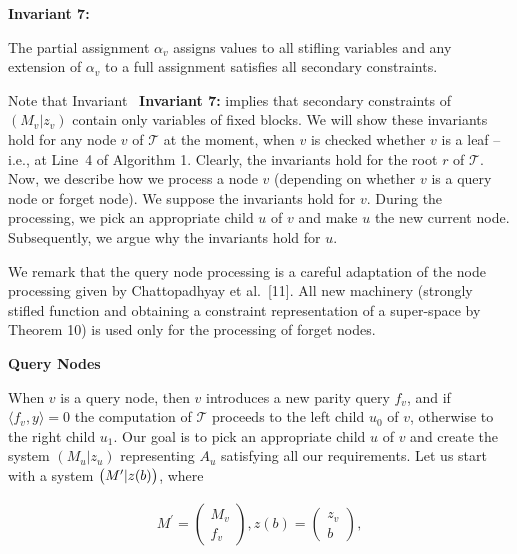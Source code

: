\documentclass[10pt,a4paper]{article}
\begin{document}
\textbf{ Invariant 7:}



The partial assignment $\alpha_{v}$ assigns values to all stifling variables and any extension of $\alpha_{v}$ to a full assignment satisfies all secondary constraints.\par







Note that Invariant \textbf{ Invariant 7:} implies that secondary constraints of $(M_{v}|z_{v})$ contain only variables of fixed blocks.
We will show these invariants hold for any node $v$ of $\mathcal{T}$ at the moment, when $v$ is checked whether $v$ is a leaf – i.e., at Line 4 of Algorithm 1.
Clearly, the invariants hold for the root $r$ of $\mathcal{T}$.
Now, we describe how we process a node $v$ (depending on whether $v$ is a query node or forget node).
We suppose the invariants hold for $v$.
During the processing, we pick an appropriate child $u$ of $v$ and make $u$ the new current node.
Subsequently, we argue why the invariants hold for $u$.\par




We remark that the query node processing is a careful adaptation of the node processing given by Chattopadhyay et al. [11].
All new machinery (strongly stifled function and obtaining a constraint representation of a super-space by Theorem 10) is used only for the processing of forget nodes.\par





\par\medskip\noindent\textbf{Query Nodes}\par




When $v$ is a query node, then $v$ introduces a new parity query $f_{v}$, and if $\langle f_{v},y\rangle=0$ the computation of $\mathcal{T}$ proceeds to the left child $u_{0}$ of $v$, otherwise to the right child $u_{1}$.
Our goal is to pick an appropriate child $u$ of $v$ and create the system $(M_{u}|z_{u})$ representing $A_{u}$ satisfying all our requirements.
Let us start with a system $\bigl{(}M^{\prime}|z(b)\bigr{)}$, where\par


\[\begin{gathered}
M^{\prime}=\begin{pmatrix}M_{v}\\
f_{v}\end{pmatrix},z(b)=\begin{pmatrix}z_{v}\\
b\end{pmatrix},
\end{gathered}\]
\end{document}
